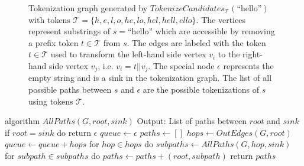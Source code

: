 \begin{figure}[htbp]
	\centering
	\caption{
Tokenization graph generated by $TokenizeCandidates_{\mathcal{T}}(\textrm{``hello''})$ with tokens $\mathcal{T} = \{ h, e, l, o, he, lo,  hel, hell, ello \}$.
The vertices represent substrings of $s = $``hello'' which are accessible by removing a prefix token $t \in \mathcal{T}$ from $s$.
The edges are labeled with the token $t \in \mathcal{T}$ used to transform the left-hand side vertex $v_i$ to the right-hand side vertex $v_j$, i.e. $v_i = t || v_j$.
The special node $\epsilon$ represents the empty string and is a sink in the tokenization graph.
The list of all possible paths between $s$ and $\epsilon$ are the possible tokenizations of $s$ using tokens $\mathcal{T}$.
}
	\label{fig:ex-graph-tokenize-candidates}
\end{figure}

\begin{Pseudocode}[float,caption={
DFS-based algorithm which generates a list of all possible paths between between two nodes in a DAG.
This algorithm's performance can be sped up by using dynamic programming to cache results of invocations of AllPaths.
},label={alg:all-paths}]
algorithm $AllPaths(G, root, sink)	$
	Output: List of paths between $root$ and $sink$
	if $root = sink$ do
		return $\epsilon$
	$queue \leftarrow \epsilon$
	$paths \leftarrow []$
	$hops \leftarrow OutEdges(G, root)$
	$queue \leftarrow queue + hops$
	for $hop \in hops$ do
		$subpaths \leftarrow AllPaths(G, hop, sink)$
		for $subpath \in subpaths$ do
			$paths \leftarrow paths + (root, subpath)$
	return $paths$
\end{Pseudocode}

